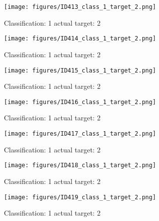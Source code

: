 \begin{figure}[h!]
\begin{center}
\texttt{[image: figures/ID413\_class\_1\_target\_2.png]}
\end{center}
\caption{ Classification: 1 actual target: 2}
\label{fig:ID413_class_1_target_2}
\end{figure}
\begin{figure}[h!]
\begin{center}
\texttt{[image: figures/ID414\_class\_1\_target\_2.png]}
\end{center}
\caption{ Classification: 1 actual target: 2}
\label{fig:ID414_class_1_target_2}
\end{figure}
\begin{figure}[h!]
\begin{center}
\texttt{[image: figures/ID415\_class\_1\_target\_2.png]}
\end{center}
\caption{ Classification: 1 actual target: 2}
\label{fig:ID415_class_1_target_2}
\end{figure}
\begin{figure}[h!]
\begin{center}
\texttt{[image: figures/ID416\_class\_1\_target\_2.png]}
\end{center}
\caption{ Classification: 1 actual target: 2}
\label{fig:ID416_class_1_target_2}
\end{figure}
\begin{figure}[h!]
\begin{center}
\texttt{[image: figures/ID417\_class\_1\_target\_2.png]}
\end{center}
\caption{ Classification: 1 actual target: 2}
\label{fig:ID417_class_1_target_2}
\end{figure}
\begin{figure}[h!]
\begin{center}
\texttt{[image: figures/ID418\_class\_1\_target\_2.png]}
\end{center}
\caption{ Classification: 1 actual target: 2}
\label{fig:ID418_class_1_target_2}
\end{figure}
\begin{figure}[h!]
\begin{center}
\texttt{[image: figures/ID419\_class\_1\_target\_2.png]}
\end{center}
\caption{ Classification: 1 actual target: 2}
\label{fig:ID419_class_1_target_2}
\end{figure}
